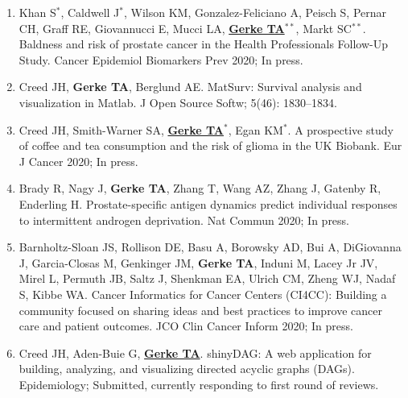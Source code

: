\documentclass[11pt, a4paper]{article} %
\begin{document}
\begin{enumerate}[leftmargin=*]
\item{} Khan S$^*$, Caldwell J$^*$, Wilson KM, Gonzalez-Feliciano A, Peisch S, Pernar CH, Graff RE, Giovannucci E, Mucci LA, \underline{{\bf Gerke TA$^{**}$}}, Markt SC$^{**}$. Baldness and risk of prostate cancer in the Health Professionals Follow-Up Study. Cancer Epidemiol Biomarkers Prev 2020; In press.

\item{} Creed JH, {\bf Gerke TA}, Berglund AE. MatSurv: Survival analysis and visualization in Matlab. J Open Source Softw; 5(46): 1830--1834.

\item{} Creed JH, Smith-Warner SA, \underline{{\bf Gerke TA$^{*}$}}, Egan KM$^*$. A prospective study of coffee and tea consumption and the risk of glioma in the UK Biobank.  Eur J Cancer 2020; In press.

\item{} Brady R, Nagy J, {\bf Gerke TA}, Zhang T, Wang AZ, Zhang J, Gatenby R, Enderling H. Prostate-specific antigen dynamics predict individual responses to intermittent androgen deprivation. Nat Commun 2020; In press.

\item{} Barnholtz-Sloan JS, Rollison DE, Basu A, Borowsky AD, Bui A, DiGiovanna J, Garcia-Closas M, Genkinger JM, {\bf Gerke TA}, Induni M, Lacey Jr JV, Mirel L, Permuth JB, Saltz J, Shenkman EA, Ulrich CM, Zheng WJ, Nadaf S, Kibbe WA. Cancer Informatics for Cancer Centers (CI4CC): Building a community focused on sharing ideas and best practices to improve cancer care and patient outcomes. JCO Clin Cancer Inform 2020; In press.


\item{} Creed JH, Aden-Buie G, \underline{{\bf Gerke TA}}. shinyDAG: A web application for building, analyzing, and visualizing directed acyclic graphs (DAGs). Epidemiology; Submitted, currently responding to first round of reviews. 

\end{enumerate}
\end{document}
